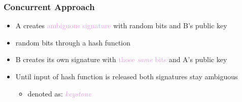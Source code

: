 \begin{frame}
	\frametitle{Concurrent Approach}
	
	\begin{itemize}[<+->]
		\setlength\itemsep{1em}
		\item A creates \textcolor{Plum}{ambiguous signature} with random bits and B's public key
		\item random bits through a hash function
		\item B creates its own signature with \textcolor{Plum}{those \textit{same} bits} and A's public key
		\item Until input of hash function is released both signatures stay ambiguous
			\begin{itemize}
				\item denoted as: \textcolor{Plum}{\textit{keystone}}
			\end{itemize}
	\end{itemize}
\end{frame}